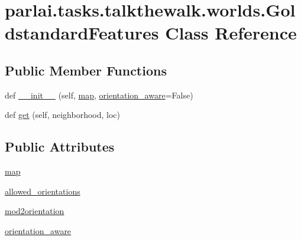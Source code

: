 \hypertarget{classparlai_1_1tasks_1_1talkthewalk_1_1worlds_1_1GoldstandardFeatures}{}\section{parlai.\+tasks.\+talkthewalk.\+worlds.\+Goldstandard\+Features Class Reference}
\label{classparlai_1_1tasks_1_1talkthewalk_1_1worlds_1_1GoldstandardFeatures}
\subsection*{Public Member Functions}
\begin{DoxyCompactItemize}
\item 
def \hyperlink{classparlai_1_1tasks_1_1talkthewalk_1_1worlds_1_1GoldstandardFeatures_ab6dbb20f1ac0881565ab51a9ab1024d3}{\+\_\+\+\_\+init\+\_\+\+\_\+} (self, \hyperlink{classparlai_1_1tasks_1_1talkthewalk_1_1worlds_1_1GoldstandardFeatures_a06fc8fd5082988b315d1119ba5ee6718}{map}, \hyperlink{classparlai_1_1tasks_1_1talkthewalk_1_1worlds_1_1GoldstandardFeatures_a2b5d762f31d162dbbd702b9c6753830f}{orientation\+\_\+aware}=False)
\item 
def \hyperlink{classparlai_1_1tasks_1_1talkthewalk_1_1worlds_1_1GoldstandardFeatures_af19258420105e5d0445029d8505e7daf}{get} (self, neighborhood, loc)
\end{DoxyCompactItemize}
\subsection*{Public Attributes}
\begin{DoxyCompactItemize}
\item 
\hyperlink{classparlai_1_1tasks_1_1talkthewalk_1_1worlds_1_1GoldstandardFeatures_a06fc8fd5082988b315d1119ba5ee6718}{map}
\item 
\hyperlink{classparlai_1_1tasks_1_1talkthewalk_1_1worlds_1_1GoldstandardFeatures_ab3bb9dde5bd73f87d51b926d2cbac56d}{allowed\+\_\+orientations}
\item 
\hyperlink{classparlai_1_1tasks_1_1talkthewalk_1_1worlds_1_1GoldstandardFeatures_a6f905157eeed25915db5932e33b468ff}{mod2orientation}
\item 
\hyperlink{classparlai_1_1tasks_1_1talkthewalk_1_1worlds_1_1GoldstandardFeatures_a2b5d762f31d162dbbd702b9c6753830f}{orientation\+\_\+aware}
\end{DoxyCompactItemize}


